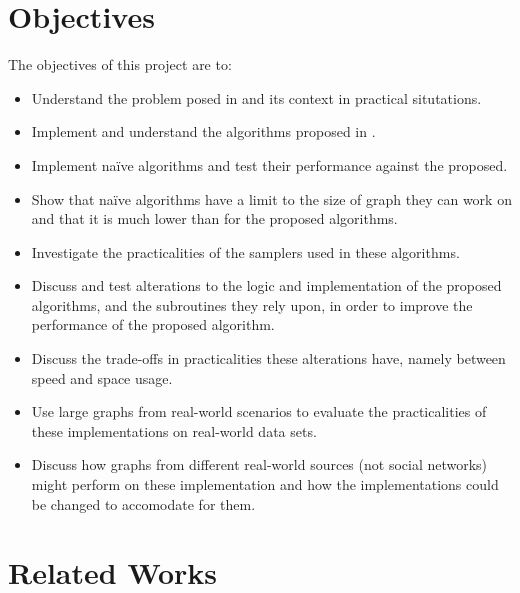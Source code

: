 \documentclass[11pt,twoside,a4paper]{report}
\begin{document}
\section{Objectives}
The objectives of this project are to:
\begin{itemize}
  \item Understand the problem posed in \cite{orig} and its context in practical situtations.
	\item Implement and understand the algorithms proposed in \cite{orig}.
  \item Implement na\"ive algorithms and test their performance against the proposed.
  \item Show that na\"ive algorithms have a limit to the size of graph they can work on and that it is much lower than for the proposed algorithms.
  \item Investigate the practicalities of the samplers used in these algorithms.
  \item Discuss and test alterations to the logic and implementation of the proposed algorithms, and the subroutines they rely upon, in order to improve the performance of the proposed algorithm.
  \item Discuss the trade-offs in practicalities these alterations have, namely between speed and space usage.
	\item Use large graphs from real-world scenarios to evaluate the practicalities of these implementations on real-world data sets.
  \item Discuss how graphs from different real-world sources (\ie not social networks) might perform on these implementation and how the implementations could be changed to accomodate for them.
\end{itemize}

\section{Related Works}

\end{document}
